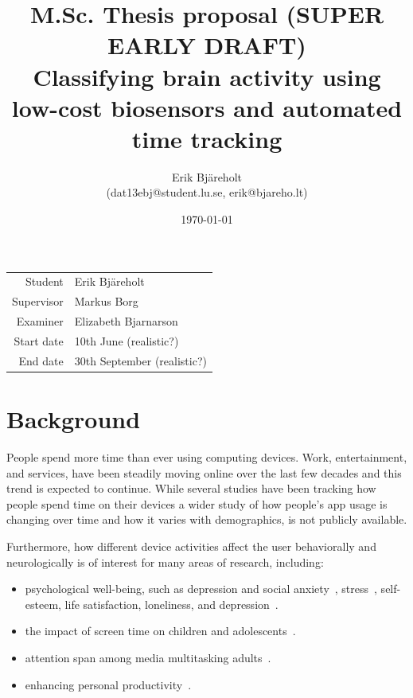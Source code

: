 \documentclass{IEEEtran}
\title{%
    \large M.Sc. Thesis proposal (SUPER EARLY DRAFT)\\
    \huge Classifying brain activity using low-cost biosensors and automated time tracking \\}
\author{Erik Bjäreholt \\(dat13ebj@student.lu.se, erik@bjareho.lt)}
\date{\today}
\begin{document}
\maketitle

\begin{center}
\begin{tabular}{r l}
 Student & Erik Bjäreholt \\
 Supervisor & Markus Borg \\
 Examiner & Elizabeth Bjarnarson \\
 Start date & 10th June (realistic?) \\
 End date & 30th September (realistic?) \\
\end{tabular}
\end{center}

\tableofcontents


\section{Background}

People spend more time than ever using computing devices. Work, entertainment, and services, have been steadily moving online over the last few decades and this trend is expected to continue.
While several studies have been tracking how people spend time on their devices a wider study of how people's app usage is changing over time and how it varies with demographics, is not publicly available.

Furthermore, how different device activities affect the user behaviorally and neurologically is of interest for many areas of research, including:

\begin{itemize}
    \item psychological well-being, such as depression and social anxiety~\cite{selfhout_different_2009}\cite{shah_nonrecursive_2002}, stress~\cite{mark_stress_2014}, self-esteem, life satisfaction, loneliness, and depression~\cite{huang_time_2017}.
    \item the impact of screen time on children and adolescents~\cite{subrahmanyam_impact_2001}.
    \item attention span among media multitasking adults~\cite{mark_stress_2014}.
    \item enhancing personal productivity~\cite{kim_timeaware_2016}.
\end{itemize}
\end{document}
